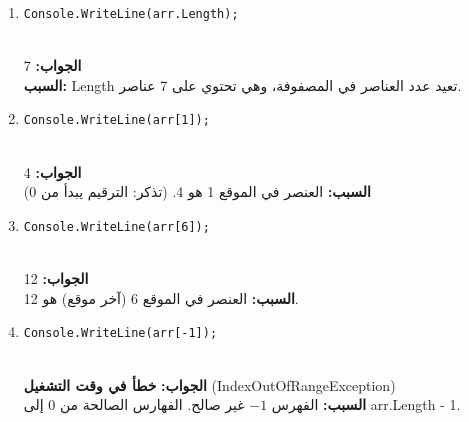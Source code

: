 \documentclass[14pt]{extarticle}
\begin{document}
\begin{enumerate}[itemsep=3em]
    \begin{english}
    \begin{enumerate}[itemsep=1.5em]
        \item \texttt{Console.WriteLine(arr.Length);}\\
        \\ \underline{\hspace{10cm}}
        \ifwithsols
        \begin{boxSolution}
        \textbf{الجواب:} \textenglish{7}\\
        \textbf{السبب:} \textenglish{Length} تعيد عدد العناصر في المصفوفة، وهي تحتوي على 7 عناصر.
        \end{boxSolution}
        \fi

        \item \texttt{Console.WriteLine(arr[1]);}\\
        \\ \underline{\hspace{10cm}}
        \ifwithsols
        \begin{boxSolution}
        \textbf{الجواب:} \textenglish{4}\\
        \textbf{السبب:} العنصر في الموقع 1 هو 4. (تذكر: الترقيم يبدأ من 0)
        \end{boxSolution}
        \fi

        \item \texttt{Console.WriteLine(arr[6]);}\\
        \\ \underline{\hspace{10cm}}
        \ifwithsols
        \begin{boxSolution}
        \textbf{الجواب:} \textenglish{12}\\
        \textbf{السبب:} العنصر في الموقع 6 (آخر موقع) هو 12.
        \end{boxSolution}
        \fi

        \item \texttt{Console.WriteLine(arr[-1]);}\\
        \\ \underline{\hspace{10cm}}
        \ifwithsols
        \begin{boxSolution}
        \textbf{الجواب:} \textbf{خطأ في وقت التشغيل} (\textenglish{IndexOutOfRangeException})\\
        \textbf{السبب:} الفهرس $-1$ غير صالح. الفهارس الصالحة من 0 إلى \textenglish{arr.Length - 1}.
        \end{boxSolution}
        \fi


\end{enumerate}
\end{english}
\end{enumerate}
\end{document}
